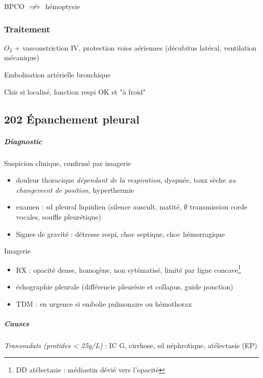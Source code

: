 \documentclass[11pt]{article}
\begin{document}
\danger BPCO \(\centernot\implies\) hémoptysie

\subsubsection{Traitement}
\label{sec:orgfc2a26a}
\(O_2\) + vasconstriction IV, protection voies aériennes (décubitus latéral,
ventilation mécanique)

Embolisation artérielle bronchique

Chir si localisé, fonction respi OK et "à froid"

\subsection{202 Épanchement pleural}
\label{sec:orge4bd6d8}
\subparagraph{Diagnostic}
\label{sec:org922d362}
Suspicion clinique, confirmé par imagerie
\begin{itemize}
\item douleur thoracique \emph{dépendant de la respiration}, dyspnée, toux sèche \emph{au
changement de position}, hyperthermie
\item examen : sd pleural liquidien (silence auscult, matité, \(\emptyset\) transmission
corde vocales, souffle pleurétique)
\item \danger Signes de gravité : détresse respi, choc septique, choc hémorragique
\end{itemize}
Imagerie
\begin{itemize}
\item RX : opacité dense, homogène, non sytématisé, limité par ligne concave\footnote{DD atélectasie : médiastin dévié vers l'opacité}
\item échographie pleurale (différencie pleurésie et collapus, guide ponction)
\item TDM : en urgence si embolie pulmonaire ou hémothorax
\end{itemize}

\subparagraph{Causes}
\label{sec:org7f5cdcb}

\emph{Transsudats (protides < 25g/L)} : IC G, cirrhose, sd néphrotique, atélectasie (EP)
\end{document}
